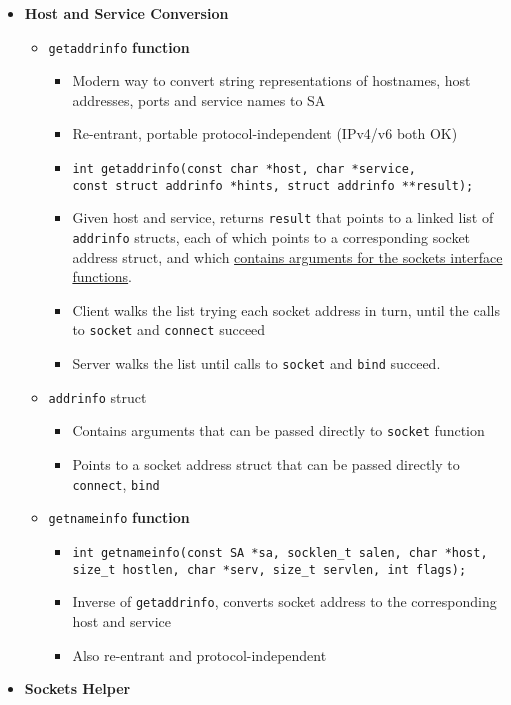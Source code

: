 \documentclass[12pt]{article}
\begin{document}
{\begin{itemize}
	\item \textbf{Host and Service Conversion}
	\begin{itemize}
		\item \texttt{getaddrinfo} \textbf{function}
		\begin{itemize}
			\item Modern way to convert string representations of hostnames, host addresses, ports and service names to SA
			\item Re-entrant, portable protocol-independent  (IPv4/v6 both OK)
			\item \texttt{int getaddrinfo(const char *host, char *service,\\
				const struct addrinfo *hints, struct addrinfo **result);}
			\item Given host and service, returns \texttt{result} that points to a linked list of \texttt{addrinfo} structs, each of which points to a corresponding socket address struct, and which \underline{contains arguments for the sockets interface functions}.
			\item Client walks the list trying each socket address in turn, until the calls to \texttt{socket} and \texttt{connect} succeed
			\item Server walks the list until calls to \texttt{socket} and \texttt{bind} succeed.
		\end{itemize}
		\item \texttt{addrinfo} struct
		\begin{itemize}
			\item Contains arguments that can be passed directly to \texttt{socket} function
			\item Points to a socket address struct that can be passed directly to \texttt{connect}, \texttt{bind}
		\end{itemize}
		\item \texttt{getnameinfo} \textbf{function}
		\begin{itemize}
			\item \texttt{int getnameinfo(const SA *sa, socklen\_t salen, char *host,\\
				size\_t hostlen, char *serv, size\_t servlen, int flags);}
			\item Inverse of \texttt{getaddrinfo}, converts socket address to the corresponding host and service
			\item Also re-entrant and protocol-independent
		\end{itemize}
	\end{itemize}
	\item \textbf{Sockets Helper}

\end{itemize}}
\end{document}
